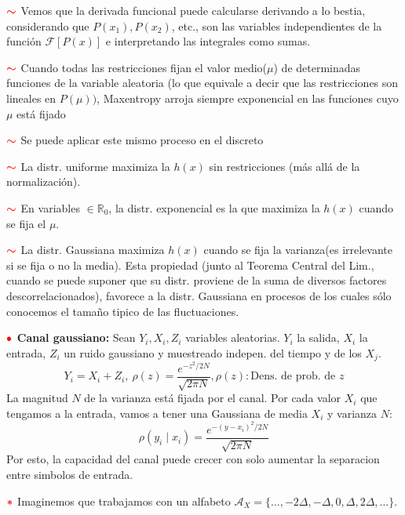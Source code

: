 \documentclass[%
 reprint,
 amsmath,amssymb,
 aps,
]{revtex4-1}
\begin{document}
\textbf{$\textcolor{red}{\color{red}{\boldsymbol{\sim}}}$}
Vemos que la derivada funcional puede calcularse derivando a lo bestia, considerando
que $P\left(x_{1}\right), P\left(x_{2}\right)$, etc., son las variables independientes de la función $\mathcal{F}[P(x)]$ e interpretando las
integrales como sumas.

\textbf{$\textcolor{red}{\color{red}{\boldsymbol{\sim}}}$}
Cuando todas las restricciones fijan el valor medio($\mu$) de determinadas funciones de la variable aleatoria (lo que equivale a decir que las restricciones son lineales en $P(\mu))$, Maxentropy arroja siempre exponencial en las funciones cuyo $\mu$ está fijado

\textbf{$\textcolor{red}{\color{red}{\boldsymbol{\sim}}}$} Se puede aplicar este mismo proceso en el discreto

\textbf{$\textcolor{red}{\color{red}{\boldsymbol{\sim}}}$} La distr. uniforme maximiza la $h(x)$ sin restricciones (más allá de la normalización).

\textbf{$\textcolor{red}{\color{red}{\boldsymbol{\sim}}}$} En variables $\in \mathbb{R}_0$, la distr. exponencial es la que maximiza la $h(x)$ cuando se fija el $\mu$.

\textbf{$\textcolor{red}{\color{red}{\boldsymbol{\sim}}}$} La distr. Gaussiana maximiza $h(x)$ cuando se fija la varianza(es irrelevante si se fija o no la media). Esta propiedad (junto al Teorema Central del Lim., cuando se puede suponer que su distr. proviene de la suma de diversos factores descorrelacionados), favorece a la distr. Gaussiana en procesos de los cuales sólo conocemos el tamaño tipico de las fluctuaciones.

\textbf{$\color{red}{\bullet}$ Canal gaussiano:} 
Sean $Y_{i}, X_{i}, Z_{i}$ variables aleatorias. $Y_{i}$ la salida, $X_{i}$ la entrada, $Z_{i}$ un ruido gaussiano y muestreado indepen. del tiempo y de los $X_j$.
$$
Y_{i}=X_{i}+Z_{i}
, \
\rho(z)=\frac{e^{-z^{2} / 2 N}}{\sqrt{2 \pi N}}, 
\rho(z): \text{Dens. de prob. de } z
$$
La magnitud $N$ de la varianza está fijada por el canal. Por cada valor $X_{i}$ que tengamos a la entrada, vamos a tener una Gaussiana de media $X_{i}$ y varianza $N$:
$$
\rho\left(y_{i} \mid x_{i}\right)=\frac{e^{-\left(y-x_{i}\right)^{2} / 2 N}}{\sqrt{2 \pi N}}
$$
Por esto, la capacidad del canal puede crecer con solo aumentar la separacion entre simbolos de entrada. 

\textbf{$\textcolor{red}{\color{red}{\boldsymbol{*}}}$} Imaginemos que trabajamos con un alfabeto $\mathcal{A}_{X}=\{\ldots,-2 \Delta,-\Delta, 0, \Delta, 2 \Delta, \ldots\}$. 
\end{document}
